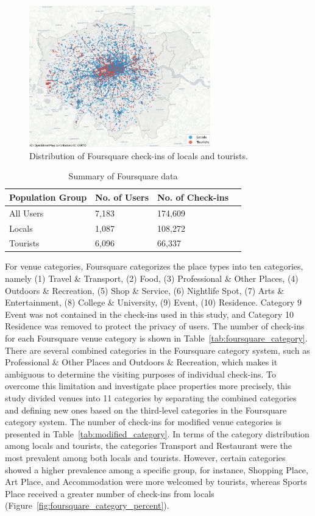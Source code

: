 \documentclass{article}
\begin{document}
\begin{figure}
\centering
\includegraphics[width=0.7\textwidth]{figures/foursquare_distribution.png}
\caption{\label{fig:foursquare_distribution}Distribution of Foursquare check-ins of locals and tourists.}
\end{figure}

\begin{table}
\centering
\caption{\label{tab:foursquare_preprocessed}Summary of Foursquare data}
\begin{tabular}{llll} \hline
Population Group & No. of Users & No. of Check-ins\\ \hline
All Users & 7,183 & 174,609 \\
Locals & 1,087 & 108,272 \\
Tourists & 6,096 & 66,337 \\ \hline
\end{tabular}
\end{table}

For venue categories, Foursquare categorizes the place types into ten categories, namely (1) Travel \& Transport, (2) Food, (3) Professional \& Other Places, (4) Outdoors \& Recreation, (5) Shop \& Service, (6) Nightlife Spot, (7) Arts \& Entertainment, (8) College \& University, (9) Event, (10) Residence. Category 9 Event was not contained in the check-ins used in this study, and Category 10 Residence was removed to protect the privacy of users. The number of check-ins for each Foursquare venue category is shown in Table~\ref{tab:foursquare_category}. There are several combined categories in the Foursquare category system, such as Professional \& Other Places and Outdoors \& Recreation, which makes it ambiguous to determine the visiting purposes of individual check-ins. To overcome this limitation and investigate place properties more precisely, this study divided venues into 11 categories by separating the combined categories and defining new ones based on the third-level categories in the Foursquare category system. The number of check-ins for modified venue categories is presented in Table~\ref{tab:modified_category}. In terms of the category distribution among locals and tourists, the categories Transport and Restaurant were the most prevalent among both locals and tourists. However, certain categories showed a higher prevalence among a specific group, for instance, Shopping Place, Art Place, and Accommodation were more welcomed by tourists, whereas Sports Place received a greater number of check-ins from locals (Figure~\ref{fig:foursquare_category_percent}).
\end{document}
